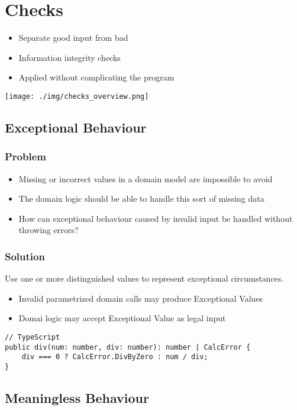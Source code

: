 
\section{Checks}
\begin{itemize}
    \item Separate good input from bad
    \item Information integrity checks
    \item Applied without complicating the program
\end{itemize}
\texttt{[image: ./img/checks\_overview.png]}

\subsection{Exceptional Behaviour}
\subsubsection{Problem}
\begin{itemize}
    \item Missing or incorrect values in a domain model are impossible to avoid
    \item The domain logic should be able to handle this sort of missing data
    \item How can exceptional behaviour caused by invalid input be handled without throwing errors?
\end{itemize}
\subsubsection{Solution}
Use one or more distinguished values to represent exceptional circumstances.
\begin{itemize}
    \item Invalid parametrized domain calls may produce Exceptional Values
    \item Domai logic may accept Exceptional Value as legal input
\end{itemize}
\begin{lstlisting}
// TypeScript
public div(num: number, div: number): number | CalcError {
    div === 0 ? CalcError.DivByZero : num / div;
}
\end{lstlisting}

\subsection{Meaningless Behaviour}
